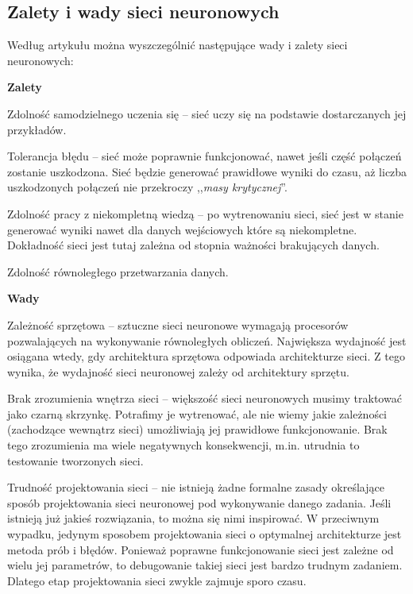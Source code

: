 \subsection{Zalety i wady sieci neuronowych}
Według artykułu \cite{neuralNetworks:wadyZalety} można wyszczególnić następujące wady i zalety sieci neuronowych:

\begin{enumerate*}
\item \textbf{Zalety}
\begin{enumerate*}
\item Zdolność samodzielnego uczenia się -- sieć uczy się na podstawie dostarczanych jej przykładów.
\item Tolerancja błędu -- sieć może poprawnie funkcjonować, nawet jeśli część połączeń zostanie uszkodzona. Sieć będzie generować prawidłowe wyniki do czasu, aż liczba uszkodzonych połączeń nie przekroczy ,,\textit{masy krytycznej}''.
\item Zdolność pracy z niekompletną wiedzą -- po wytrenowaniu sieci, sieć jest w stanie generować wyniki nawet dla danych wejściowych które są niekompletne. Dokładność sieci jest tutaj zależna od stopnia ważności brakujących danych.
\item Zdolność równoległego przetwarzania danych.
\end{enumerate*}
\item \textbf{Wady}
\begin{enumerate*}
\item Zależność sprzętowa -- sztuczne sieci neuronowe wymagają procesorów pozwalających na wykonywanie równoległych obliczeń. Największa wydajność jest osiągana wtedy, gdy architektura sprzętowa odpowiada architekturze sieci. Z tego wynika, że wydajność sieci neuronowej zależy od architektury sprzętu.
\item Brak zrozumienia wnętrza sieci -- większość sieci neuronowych musimy traktować jako czarną skrzynkę. Potrafimy je wytrenować, ale nie wiemy jakie zależności (zachodzące wewnątrz sieci) umożliwiają jej prawidłowe funkcjonowanie. Brak tego zrozumienia ma wiele negatywnych konsekwencji, m.in. utrudnia to testowanie tworzonych sieci.
\item Trudność projektowania sieci -- nie istnieją żadne formalne zasady określające sposób projektowania sieci neuronowej pod wykonywanie danego zadania. Jeśli istnieją już jakieś rozwiązania, to można się nimi inspirować. W przeciwnym wypadku, jedynym sposobem projektowania sieci o optymalnej architekturze jest metoda prób i błędów. Ponieważ poprawne funkcjonowanie sieci jest zależne od wielu jej parametrów, to debugowanie takiej sieci jest bardzo trudnym zadaniem. Dlatego etap projektowania sieci zwykle zajmuje sporo czasu.

\end{enumerate*}
\end{enumerate*}
